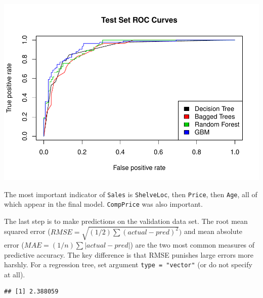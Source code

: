 \documentclass[]{book}
\newenvironment{Shaded}{\begin{snugshade}}{\end{snugshade}}
\newcommand{\DataTypeTok}[1]{\textcolor[rgb]{0.13,0.29,0.53}{#1}}
\newcommand{\DecValTok}[1]{\textcolor[rgb]{0.00,0.00,0.81}{#1}}
\newcommand{\KeywordTok}[1]{\textcolor[rgb]{0.13,0.29,0.53}{\textbf{#1}}}
\newcommand{\NormalTok}[1]{#1}
\newcommand{\OperatorTok}[1]{\textcolor[rgb]{0.81,0.36,0.00}{\textbf{#1}}}
\newcommand{\StringTok}[1]{\textcolor[rgb]{0.31,0.60,0.02}{#1}}
\begin{document}
\includegraphics{data-sci_files/figure-latex/unnamed-chunk-68-1.pdf}

The most important indicator of \texttt{Sales} is \texttt{ShelveLoc}, then \texttt{Price}, then \texttt{Age}, all of which appear in the final model. \texttt{CompPrice} was also important.

The last step is to make predictions on the validation data set. The root mean squared error (\(RMSE = \sqrt{(1/2) \sum{(actual - pred)^2}})\) and mean absolute error (\(MAE = (1/n) \sum{|actual - pred|}\)) are the two most common measures of predictive accuracy. The key difference is that RMSE punishes large errors more harshly. For a regression tree, set argument \texttt{type\ =\ "vector"} (or do not specify at all).

\begin{Shaded}
\end{Shaded}

\begin{verbatim}
## [1] 2.388059
\end{verbatim}
\end{document}
